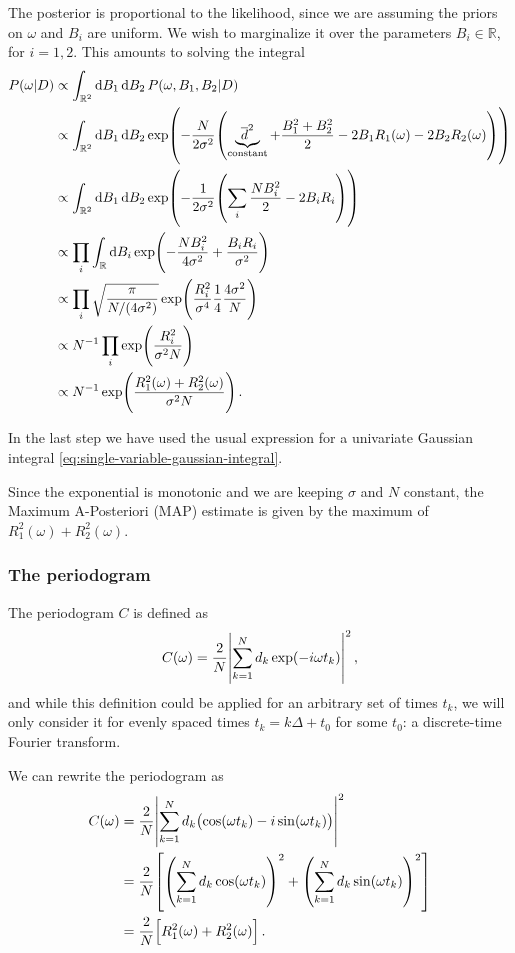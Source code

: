 \documentclass[main.tex]{subfiles}
\begin{document}
The posterior is proportional to the likelihood, since we are assuming the priors on \(\omega \) and \(B_i\) are uniform. 
We wish to marginalize it over the parameters \(B_i \in \mathbb{R}\), for \(i = 1, 2\).
This amounts to solving the integral 
%
\begin{align}
P (\omega | D) &\propto \int_{\mathbb{R}^2} \dd{B_1 } \dd{B_2 } P (\omega , B_1 , B_2  | D)   \\
&\propto \int_{\mathbb{R}^2} \dd{B_1 } \dd{B_2 }
\exp(- \frac{N}{2 \sigma^2} \qty(\underbrace{\overline{d}^2}_{\text{constant}} + \frac{B_1^2 + B_2^2}{2} - 2 B_1 R_1(\omega ) -2  B_2 R_2(\omega )))  \\
&\propto \int_{\mathbb{R}^2} \dd{B_1} \dd{B_2 } \exp(- \frac{1}{2 \sigma^2} \qty( \sum _{i} \frac{N B_i^2}{2} - 2 B_i R_i)) \\
&\propto \prod_i \int_{\mathbb{R}} \dd{B_i}
\exp(- \frac{N B_i^2}{4 \sigma^2} + \frac{B_i R_i}{\sigma^2})  \\
&\propto \prod_i \sqrt{ \frac{\pi}{N / (4 \sigma^2)}}
\exp( \frac{R_i^2}{\sigma^{4}} \frac{1}{4} \frac{4 \sigma^2 }{N})  \\
&\propto N^{-1} \prod_i \exp( \frac{R_i^2}{\sigma^2 N})  \\
&\propto N^{-1} \exp(\frac{R_1^2(\omega ) + R_2^2(\omega )}{\sigma^2 N})
\,.
\end{align}

In the last step we have used the usual expression for a univariate Gaussian integral \eqref{eq:single-variable-gaussian-integral}. 

Since the exponential is monotonic and we are keeping \(\sigma \) and \(N \) constant, the Maximum A-Posteriori (MAP) estimate is given by the maximum of \(R_1^2 (\omega ) + R_2^2 (\omega )\).

\subsubsection{The periodogram}

The periodogram \(C\) is defined as 
%
\begin{align}
C(\omega ) = \frac{2}{N} \abs{\sum _{k=1}^{N} d_k \exp(- i \omega t_k)}^2
\,,
\end{align}
%
and while this definition could be applied for an arbitrary set of times \(t_k\), we will only consider it for evenly spaced times \(t_k = k \Delta  + t_0 \) for some \(t_0 \): a discrete-time Fourier transform. 

We can rewrite the periodogram as 
%
\begin{align}
C(\omega ) &= \frac{2}{N} \abs{\sum _{k=1}^{N} d_k \qty(\cos(\omega t_k) - i \sin(\omega t_k))}^2  \\
&= \frac{2}{N} \qty[ \qty(\sum _{k=1}^{N} d_k \cos(\omega t_k))^2 + \qty(\sum _{k=1}^{N} d_k \sin(\omega t_k))^2]  \\
&= \frac{2}{N} \qty[R_1^2(\omega ) + R_2^2 (\omega )]
\,.
\end{align}
\end{document}
